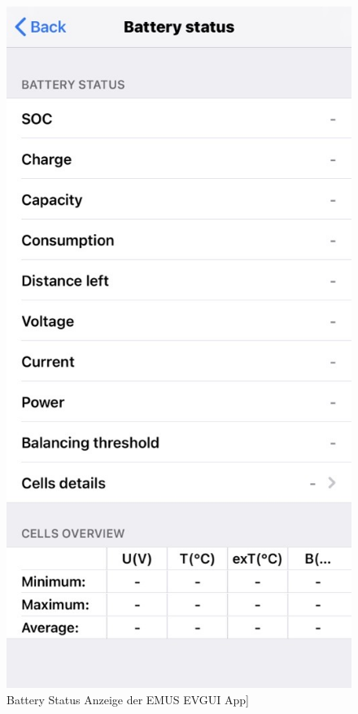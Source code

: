 \begin{figure}[H]
	\begin{center}
		\includegraphics[scale=0.4]{figures/Akku/BMSBatteryStatus.png}
		\caption{Battery Status Anzeige der EMUS EVGUI App\cite{BatteryStatusApp}]}
		\label{fig: Battery Status Anzeige der EMUS EVGUI App}
	\end{center}
\end{figure}
\newpage

